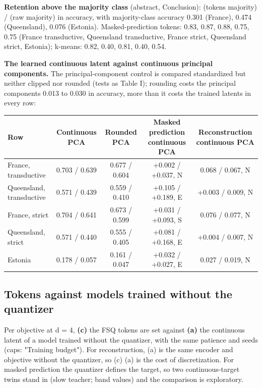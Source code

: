 \documentclass[10pt]{article}
\begin{document}
\textbf{Retention above the majority class} (abstract, Conclusion): (tokens \textminus{} majority) / (raw \textminus{} majority) in accuracy, with majority-class accuracy 0.301 (France), 0.474 (Queensland), 0.076 (Estonia). Masked-prediction tokens: 0.83, 0.87, 0.88, 0.75, 0.75 (France transductive, Queensland transductive, France strict, Queensland strict, Estonia); k-means: 0.82, 0.40, 0.81, 0.40, 0.54.

\textbf{The learned continuous latent against continuous principal components.} The principal-component control is compared standardized but neither clipped nor rounded (tests as Table I); rounding costs the principal components 0.013 to 0.030 in accuracy, more than it costs the trained latents in every row:

\begin{center}\footnotesize
\begin{tabular}{@{}lcccc@{}}
\toprule
Row & Continuous PCA & Rounded PCA & Masked prediction \textminus{} continuous PCA & Reconstruction \textminus{} continuous PCA \\
\midrule
France, transductive & 0.703 / 0.639 & 0.677 / 0.604 & +0.002 / +0.037, N & \textminus{}0.068 / \textminus{}0.067, N \\
Queensland, transductive & 0.571 / 0.439 & 0.559 / 0.410 & +0.105 / +0.189, E & +0.003 / \textminus{}0.009, N \\
France, strict & 0.704 / 0.641 & 0.673 / 0.599 & +0.031 / +0.093, S & \textminus{}0.076 / \textminus{}0.077, N \\
Queensland, strict & 0.571 / 0.440 & 0.555 / 0.405 & +0.081 / +0.168, E & +0.004 / \textminus{}0.007, N \\
Estonia & 0.178 / 0.057 & 0.161 / 0.047 & +0.032 / +0.027, E & \textminus{}0.027 / \textminus{}0.019, N \\
\bottomrule
\end{tabular}
\end{center}

\subsection{Tokens against models trained without the quantizer}

Per objective at d = 4, \textbf{(c)} the FSQ tokens are set against \textbf{(a)} the continuous latent of a model trained without the quantizer, with the same patience and seeds (caps: "Training budget"). For reconstruction, (a) is the same encoder and objective without the quantizer, so (c) \textminus{} (a) is the cost of discretization. For masked prediction the quantizer defines the target, so two continuous-target twins stand in (slow teacher; band values) and the comparison is exploratory.
\end{document}

